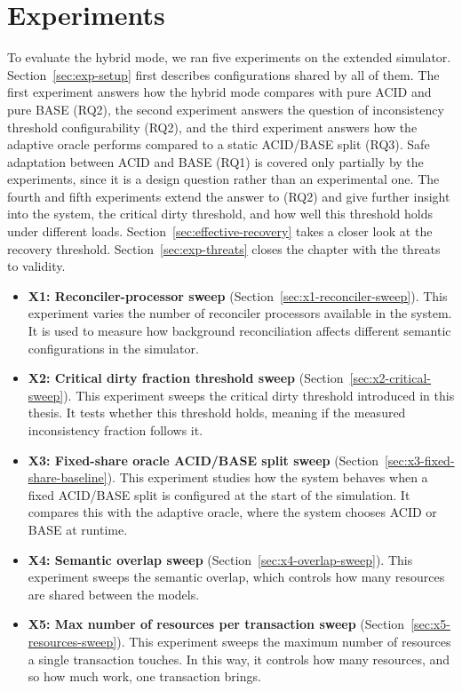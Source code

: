 
\chapter{Experiments}\label{chapter:experiments}

To evaluate the hybrid mode, we ran five experiments on the extended simulator.
Section~\ref{sec:exp-setup} first describes configurations shared by all of
them. The first experiment answers how the hybrid mode compares with pure ACID and pure
BASE (RQ2), the second experiment answers the question of inconsistency threshold
configurability (RQ2), and the third experiment answers how the adaptive oracle
performs compared to a static ACID/BASE split (RQ3). Safe adaptation between ACID
and BASE (RQ1) is covered only partially by
the experiments, since it is a design question rather than an experimental one.
The fourth and fifth experiments extend the answer to (RQ2) and give further insight into the system,
the critical dirty threshold, and how well this threshold holds under
different loads. Section~\ref{sec:effective-recovery} takes a closer look at the
recovery threshold. Section~\ref{sec:exp-threats} closes the chapter with the
threats to validity.

\begin{itemize}
  \item \textbf{X1: Reconciler-processor sweep}
        (Section~\ref{sec:x1-reconciler-sweep}). This experiment varies the
        number of reconciler processors available in the system. It is used to
        measure how background reconciliation affects different semantic
        configurations in the simulator.

  \item \textbf{X2: Critical dirty fraction threshold sweep}
        (Section~\ref{sec:x2-critical-sweep}). This experiment sweeps the
        critical dirty threshold introduced in this thesis. It tests whether
        this threshold holds, meaning if the measured inconsistency fraction
        follows it.

  \item \textbf{X3: Fixed-share oracle ACID/BASE split sweep}
        (Section~\ref{sec:x3-fixed-share-baseline}). This experiment studies how
        the system behaves when a fixed ACID/BASE split is configured at the
        start of the simulation. It compares this with the adaptive oracle,
        where the system chooses ACID or BASE at runtime.

  \item \textbf{X4: Semantic overlap sweep}
        (Section~\ref{sec:x4-overlap-sweep}). This experiment sweeps the
        semantic overlap, which controls how many resources are shared between
        the models.

  \item \textbf{X5: Max number of resources per transaction sweep}
        (Section~\ref{sec:x5-resources-sweep}). This experiment sweeps the
        maximum number of resources a single transaction touches. In this way,
        it controls how many resources, and so how much work, one transaction
        brings.
\end{itemize}

